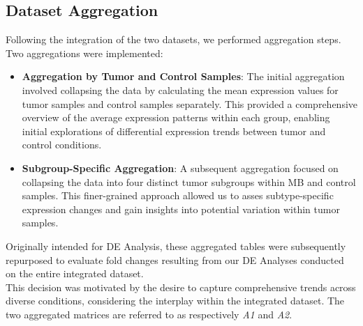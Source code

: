\documentclass[10pt]{SelfArx} %
\begin{document}
\subsection{Dataset Aggregation}\label{sec:aggregation_methods}
Following the integration of the two datasets, we performed aggregation steps. Two aggregations were implemented:
\begin{itemize}
    \item \textbf{Aggregation by Tumor and Control Samples}: The initial aggregation involved collapsing the data by calculating the mean expression values for tumor samples and control samples separately. This provided a comprehensive overview of the average expression patterns within each group, enabling initial explorations of differential expression trends between tumor and control conditions. 
    \item \textbf{Subgroup-Specific Aggregation}: A subsequent aggregation focused on collapsing the data into four distinct tumor subgroups within MB and control samples. This finer-grained approach allowed us to asses subtype-specific expression changes and gain insights into potential variation within tumor samples. 
\end{itemize}
Originally intended for DE Analysis, these aggregated tables were subsequently repurposed to evaluate fold changes resulting from our DE Analyses conducted on the entire integrated dataset. \\
This decision was motivated by the desire to capture comprehensive trends across diverse conditions, considering the interplay within the integrated dataset. 
The two aggregated matrices are referred to as respectively \textit{A1} and \textit{A2}.
\end{document}
